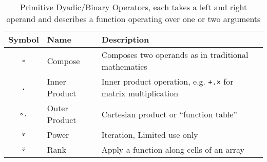 \documentclass[numbers,preprint]{sigplanconf}
\begin{document}
\begin{table*}
\centering
\begin{tabular}{cll}
\toprule
Symbol     & Name & Description \\
\midrule
\texttt{∘} & Compose & Composes two operands as in traditional mathematics \\
\texttt{.} & Inner Product & Inner product operation, e.g.
 \texttt{+.×} for matrix multiplication \\
\texttt{∘.} & Outer Product & Cartesian product or ``function table'' \\
\texttt{⍣} & Power & Iteration, Limited use only \\
\texttt{⍤} & Rank & Apply a function along cells of an array \\
\end{tabular}
\caption{Primitive Dyadic/Binary Operators, each takes a left
 and right operand and describes a function operating over one or two arguments}
\label{tab:conjunctions}
\end{table*}
\end{document}
